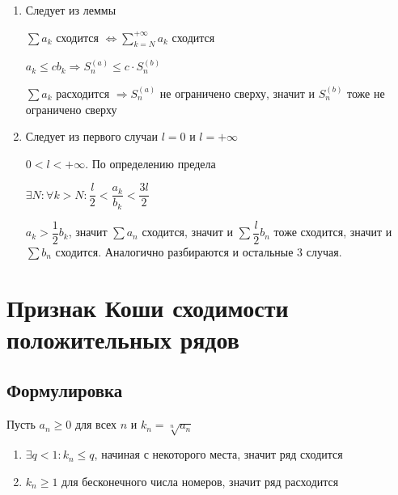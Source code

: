 \documentclass{article}
\begin{document}
                \begin{enumerate}
                
                    \item Следует из леммы
                    
                        $\sum a_k$ сходится $\Leftrightarrow \sum\limits^{+\infty}_{k = N} a_k$ сходится
                        
                        $a_k \leq c b_k \Rightarrow S_n^{(a)} \leq c \cdot S^{(b)}_n$
                        
                        $\sum a_k$ расходится $\Rightarrow S^{(a)}_n$ не ограничено сверху, значит и $S^{(b)}_n$ тоже не ограничено сверху
                        
                    \item Следует из первого случаи $l = 0$ и $l = +\infty$
                    
                        $0 < l < +\infty$. По определению предела
                        
                            $\exists N : \forall k > N : \dfrac{l}{2} < \dfrac{a_k}{b_k} < \dfrac{3l}{2}$
                            
                            $a_k > \dfrac{1}{2} b_k$, значит $\sum a_n$ сходится, значит и $\sum \dfrac{l}{2} b_n$ тоже сходится, значит и $\sum b_n$ сходится. Аналогично разбираются и остальные $3$ случая.
                    
                \end{enumerate}
                
    \newpage
    
    \section{Признак Коши сходимости положительных рядов}
    
        \subsection{Формулировка}
        
            Пусть $a_n \geq 0$ для всех $n$ и $k_n = \sqrt[n]{a_n}$
            
            \begin{enumerate}
            
                \item $\exists q < 1 : k_n \leq q$, начиная с некоторого места, значит ряд сходится 
                
                \item $k_n \geq 1$ для бесконечного числа номеров, значит ряд расходится
                
            \end{enumerate}
            
\end{document}
